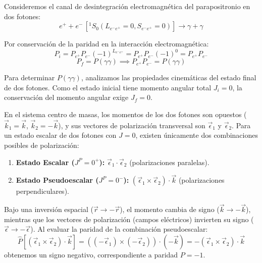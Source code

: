 Consideremos el canal de desintegración electromagnética del parapositronio en dos fotones:
\begin{equation}
    e^+ + e^- \, [^1S_0 (L_{e^-e^+}=0, S_{e^-e^+}=0)] \longrightarrow \gamma + \gamma
\end{equation}

Por conservación de la paridad en la interacción electromagnética:
\begin{equation}
    P_i = P_{e^+} P_{e^-} (-1)^{L_{e^-e^+}} = P_{e^+} P_{e^-} (-1)^0 = P_{e^+} P_{e^-}
\end{equation}
\begin{equation}
    P_f = P(\gamma \gamma) \implies P_{e^+} P_{e^-} = P(\gamma \gamma)
\end{equation}

Para determinar $P(\gamma\gamma)$, analizamos las propiedades cinemáticas del estado final de dos fotones. Como el estado inicial tiene momento angular total $J_i = 0$, la conservación del momento angular exige $J_f = 0$.

En el sistema centro de masas, los momentos de los dos fotones son opuestos ($\vec{k}_1 = \vec{k}$, $\vec{k}_2 = -\vec{k}$), y sus vectores de polarización transversal son $\vec{\epsilon}_1$ y $\vec{\epsilon}_2$. Para un estado escalar de dos fotones con $J=0$, existen únicamente dos combinaciones posibles de polarización:
\begin{enumerate}
    \item \textbf{Estado Escalar ($J^P = 0^+$):} $\vec{\epsilon}_1 \cdot \vec{\epsilon}_2$ (polarizaciones paralelas).
    \item \textbf{Estado Pseudoescalar ($J^P = 0^-$):} $(\vec{\epsilon}_1 \times \vec{\epsilon}_2) \cdot \vec{k}$ (polarizaciones perpendiculares).
\end{enumerate}

Bajo una inversión espacial ($\vec{r} \to -\vec{r}$), el momento cambia de signo ($\vec{k} \to -\vec{k}$), mientras que los vectores de polarización (campos eléctricos) invierten su signo ($\vec{\epsilon} \to -\vec{\epsilon}$). Al evaluar la paridad de la combinación pseudoescalar:
\begin{equation}
    \hat{P} \left[ (\vec{\epsilon}_1 \times \vec{\epsilon}_2) \cdot \vec{k} \right] = ((-\vec{\epsilon}_1) \times (-\vec{\epsilon}_2)) \cdot (-\vec{k}) = - (\vec{\epsilon}_1 \times \vec{\epsilon}_2) \cdot \vec{k}
\end{equation}
obtenemos un signo negativo, correspondiente a paridad $P = -1$.

